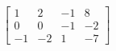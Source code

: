 \documentclass[preview]{standalone}
\begin{document}
\begin{align*}
\left[\begin{array}{ccc|c} 1 & 2 & -1 & 8 \\ 0 & 0 & -1 & -2 \\ -1 & -2 & 1 & -7 \end{array}\right]
\end{align*}
\end{document}
